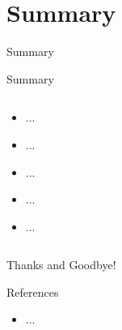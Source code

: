 \section{Summary}

\bottomline{}
\begin{frame}
\centering \Huge Summary
\end{frame}

\begin{frame}{Summary}
\begin{columns}
\centering
[...Graphics...]
\centering
[...Graphics...]
\begin{spacing}{2}
\begin{itemize}
\item ...
\item ...
\item ...
\item ...
\item ...
\end{itemize}
\end{spacing}
\end{columns}
\end{frame}

\bottomline{}
\begin{frame}
\centering \Huge Thanks and Goodbye!
\end{frame}

\bottomline{}
\begin{frame}{References}
\footnotesize
\begin{itemize}
\item ...
\end{itemize}
\end{frame}
